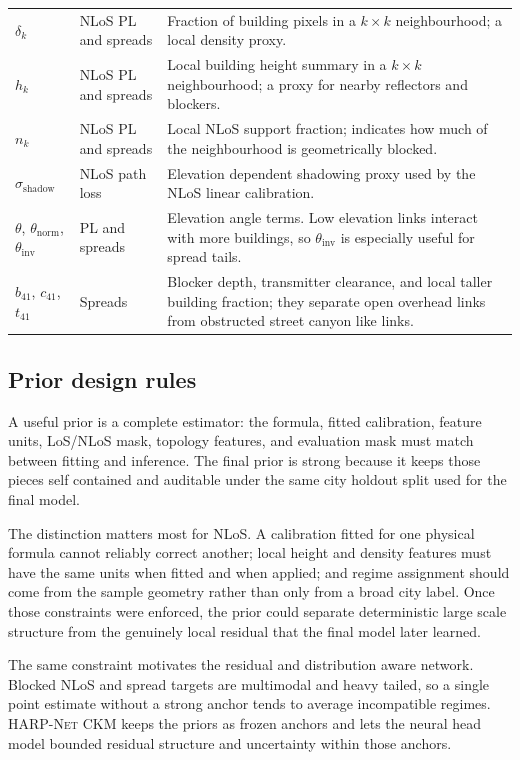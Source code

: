 \begin{table}[H]
\begin{tabularx}{\textwidth}{>{\raggedright\arraybackslash}p{}
>{\raggedright\arraybackslash}p{}
>{\raggedright\arraybackslash}X}
\(\delta_k\) & NLoS PL and spreads &
Fraction of building pixels in a \(k\times k\) neighbourhood; a local density
proxy. \\
\(h_k\) & NLoS PL and spreads &
Local building height summary in a \(k\times k\) neighbourhood; a proxy for
nearby reflectors and blockers. \\
\(n_k\) & NLoS PL and spreads &
Local NLoS support fraction; indicates how much of the neighbourhood is
geometrically blocked. \\
\(\sigma_{\mathrm{shadow}}\) & NLoS path loss &
Elevation dependent shadowing proxy used by the NLoS linear calibration. \\
\(\theta\), \(\theta_{\mathrm{norm}}\), \(\theta_{\mathrm{inv}}\) &
PL and spreads &
Elevation angle terms. Low elevation links interact with more buildings, so
\(\theta_{\mathrm{inv}}\) is especially useful for spread tails. \\
\(b_{41}\), \(c_{41}\), \(t_{41}\) & Spreads &
Blocker depth, transmitter clearance, and local taller building fraction; they
separate open overhead links from obstructed street canyon like links. \\
\bottomrule
\end{tabularx}
\end{table}

\subsection{Prior design rules}
\label{sec:good_prior_design}

A useful prior is a complete estimator: the formula, fitted calibration,
feature units, LoS/NLoS mask, topology features, and evaluation mask must match
between fitting and inference. The final prior is strong because it keeps those
pieces self contained and auditable under the same city holdout split used for
the final model.

The distinction matters most for NLoS. A calibration fitted for one physical
formula cannot reliably correct another; local height and density features
must have the same units when fitted and when applied; and regime assignment
should come from the sample geometry rather than only from a broad city label.
Once those constraints were enforced, the prior could separate deterministic
large scale structure from the genuinely local residual that the final model later
learned.

The same constraint motivates the residual and distribution aware network.
Blocked NLoS and spread targets are multimodal and heavy tailed, so a single
point estimate without a strong anchor tends to average incompatible regimes.
\textsc{HARP-Net CKM} keeps the priors as frozen anchors and lets the neural
head model bounded residual structure and uncertainty within those anchors.

